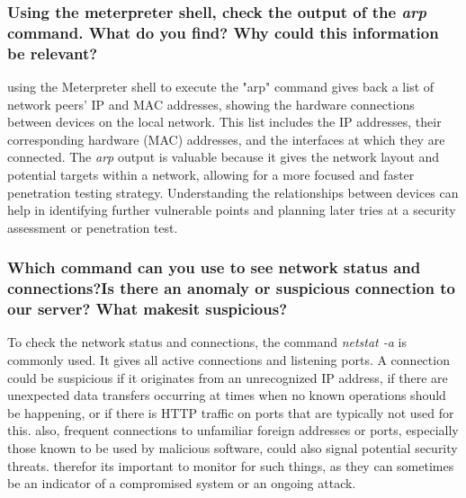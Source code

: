\subsubsection{Using the meterpreter shell, check the output of the \textit{arp} command. What do you find? Why could this information be relevant?}
using the Meterpreter shell to execute the "arp" command gives back a list of network peers' IP and MAC addresses, showing the hardware connections between devices on the local network.
This list includes the IP addresses, their corresponding hardware (MAC) addresses, and the interfaces at which they are connected.
The \textit{arp} output is valuable because it gives the network layout and potential targets within a network,
allowing for a more focused and faster penetration testing strategy. Understanding the relationships between devices can help in identifying further vulnerable points
and planning later tries at a security assessment or penetration test.

\subsubsection{Which command can you use to see network status and connections?Is there an anomaly or suspicious connection to our server? What makesit suspicious?}
To check the network status and connections, the command \textit{netstat -a} is commonly used.
It gives all active connections and listening ports. A connection could be suspicious if it originates from an unrecognized IP address,
if there are unexpected data transfers occurring at times when no known operations should be happening, or if there is HTTP traffic on ports that are typically not used for this.
also, frequent connections to unfamiliar foreign addresses or ports, especially those known to be used by malicious software, could also signal potential security threats.
therefor its important to monitor for such things, as they can sometimes be an indicator of a compromised system or an ongoing attack.